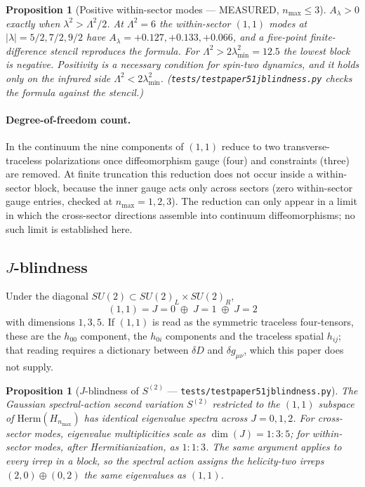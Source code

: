 \documentclass[11pt,a4paper]{article}
\theoremstyle{plain}
\newtheorem{proposition}[theorem]{Proposition}
\theoremstyle{definition}
\renewcommand{\_}{\textunderscore\allowbreak}
\begin{document}
\begin{proposition}[Positive within-sector modes --- MEASURED, $n_{\max} \le 3$]
\label{prop:graviton_physical}
$A_\lambda > 0$ exactly when $\lambda^2 > \Lambda^2/2$. At $\Lambda^2 = 6$
the within-sector $(1,1)$ modes at $|\lambda| = 5/2, 7/2, 9/2$ have
$A_\lambda = +0.127, +0.133, +0.066$, and a five-point finite-difference
stencil reproduces the formula. For $\Lambda^2 > 2\lambda_{\min}^2 = 12.5$
the lowest block is negative. Positivity is a necessary condition for
spin-two dynamics, and it holds only on the infrared side
$\Lambda^2 < 2\lambda_{\min}^2$. (\texttt{tests/test\_paper51\_j\_blindness.py}
checks the formula against the stencil.)
\end{proposition}

\paragraph{Degree-of-freedom count.} In the continuum the nine components
of $(1,1)$ reduce to two transverse-traceless polarizations once
diffeomorphism gauge (four) and constraints (three) are removed. At finite
truncation this reduction does not occur inside a within-sector block,
because the inner gauge acts only across sectors (zero within-sector gauge
entries, checked at $n_{\max} = 1, 2, 3$). The reduction can only appear in
a limit in which the cross-sector directions assemble into continuum
diffeomorphisms; no such limit is established here.

\subsection{$J$-blindness}

Under the diagonal $SU(2) \subset SU(2)_L \times SU(2)_R$,
\begin{equation}
  (1, 1) = J{=}0 \;\oplus\; J{=}1 \;\oplus\; J{=}2
  \label{eq:j_decomp}
\end{equation}
with dimensions $1, 3, 5$. If $(1,1)$ is read as the symmetric traceless
four-tensors, these are the $h_{00}$ component, the $h_{0i}$ components and
the traceless spatial $h_{ij}$; that reading requires a dictionary between
$\delta D$ and $\delta g_{\mu\nu}$, which this paper does not supply.

\begin{proposition}[$J$-blindness of $S^{(2)}$ --- \texttt{tests/test\_paper51\_j\_blindness.py}]
\label{thm:j_blindness}
The Gaussian spectral-action second variation $S^{(2)}$ restricted to
the $(1, 1)$ subspace of $\mathrm{Herm}(H_{n_{\max}})$ has identical
eigenvalue spectra across $J = 0, 1, 2$. For cross-sector modes,
eigenvalue multiplicities scale as $\dim(J) = 1{:}3{:}5$; for
within-sector modes, after Hermitianization, as $1{:}1{:}3$.
The same argument applies to every irrep in a block, so the spectral action
assigns the helicity-two irreps $(2,0)\oplus(0,2)$ the same eigenvalues as
$(1,1)$.
\end{proposition}
\end{document}
